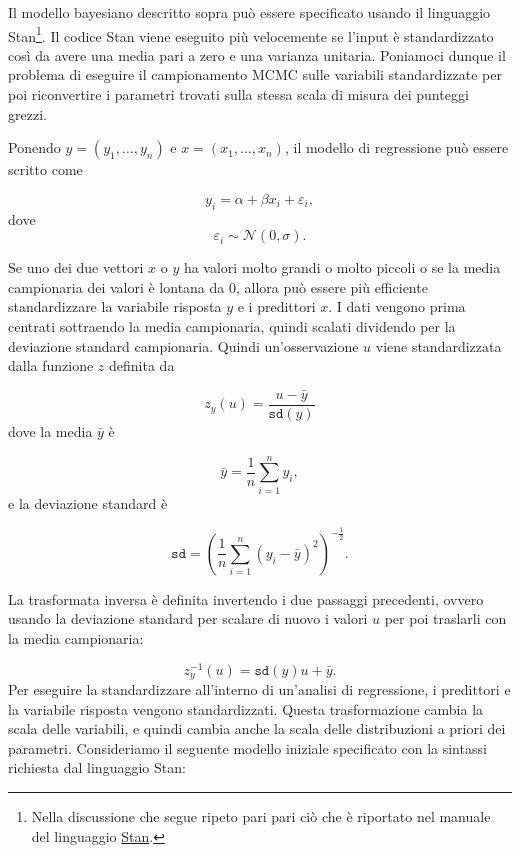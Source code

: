 \documentclass[
]{memoir}
\begin{document}
Il modello bayesiano descritto sopra può essere specificato usando il linguaggio Stan\footnote{Nella discussione che segue ripeto pari pari ciò che è riportato nel manuale del linguaggio \href{https://mc-stan.org/docs/2_27/stan-users-guide/standardizing-predictors-and-outputs.html}{Stan}.}. Il codice Stan viene eseguito più velocemente se l'input è standardizzato così da avere una media pari a zero e una varianza unitaria. Poniamoci dunque il problema di eseguire il campionamento MCMC sulle variabili standardizzate per poi riconvertire i parametri trovati sulla stessa scala di misura dei punteggi grezzi.

Ponendo \(y = (y_1, \dots, y_n)\) e \(x = (x_1, \dots, x_n)\), il modello di regressione può essere scritto come

\[
y_i = \alpha + \beta x_i + \varepsilon_i,
\]
\noindent
dove
\[
\varepsilon_i \sim \mathcal{N}(0, \sigma).
\]

\noindent
Se uno dei due vettori \(x\) o \(y\) ha valori molto grandi o molto piccoli o se la media campionaria dei valori è lontana da 0, allora può essere più efficiente standardizzare la variabile risposta \(y\) e i predittori \(x\). I dati vengono prima centrati sottraendo la media campionaria, quindi scalati dividendo per la deviazione standard campionaria. Quindi un'osservazione \(u\) viene standardizzata dalla funzione \(z\) definita da

\[
z_y(u) = \frac{u - \bar{y}}{\texttt{sd}(y)}
\]
\noindent
dove la media \(\bar{y}\) è

\[
\bar{y} = \frac{1}{n} \sum_{i=1}^n y_i,
\]
\noindent
e la deviazione standard è

\[
\texttt{sd} = \left(\frac{1}{n}\sum_{i=1}^n(y_i - \bar{y})^2\right)^{-\frac{1}{2}}.
\]

La trasformata inversa è definita invertendo i due passaggi precedenti, ovvero usando la deviazione standard per scalare di nuovo i valori \(u\) per poi traslarli con la media campionaria:

\[
z_y^{-1}(u) = \texttt{sd}(y)u + \bar{y}.
\]
Per eseguire la standardizzare all'interno di un'analisi di regressione, i predittori e la variabile risposta vengono standardizzati. Questa trasformazione cambia la scala delle variabili, e quindi cambia anche la scala delle distribuzioni a priori dei parametri. Consideriamo il seguente modello iniziale specificato con la sintassi richiesta dal linguaggio Stan:
\end{document}
